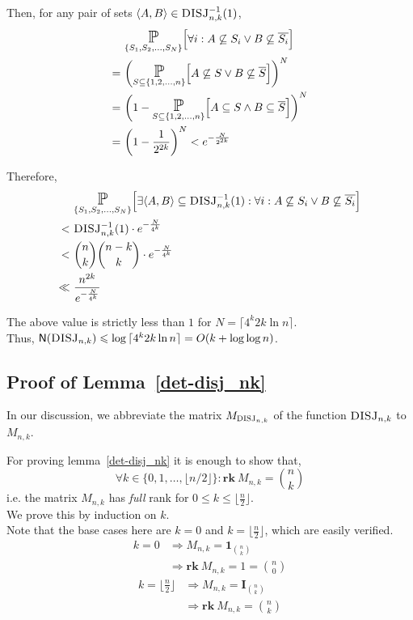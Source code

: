\documentclass[usletter]{article}
\newcommand*{\Scale}[2][4]{\scalebox{#1}{\ensuremath{#2}}}%
\newcommand {\mat}[1]  {\ensuremath{\mathbf{#1}}}
\newcommand {\complexity}[1] {\ensuremath{\mathsf{#1}}}
\newcommand {\N}             {\complexity{N}}
\newcommand {\function}[2]  {\ensuremath{\textsc{#1}_{#2}}}
\newcommand {\efunction}[3] {\ensuremath{\textsc{#1}^{#2}_{#3}}}
\newcommand {\DISJ}[2]      {\function{DISJ}{#1,#2}}
\newcommand {\iDISJ}[2]     {\efunction{DISJ}{-1}{#1,#2}}
\newcommand {\bigO}     {\ensuremath{O}}
\newcommand {\rank}     {\ensuremath{\mathbf{rk}}\ }
\newcommand {\operator}[1] {\ensuremath{\mathbb{#1}}}
\newcommand {\prob}        {\operator{P}}
\newcommand {\range}[2]  {\ensuremath{\{#1{1},#1{2},\ldots,#1{#2}\}}}
\newcommand {\zrange}[2] {\ensuremath{\{#1{0},#1{1},\ldots,#1{#2}\}}}
\begin{document}
\noindent
Then, for any pair of sets $\langle A, B\rangle \in \iDISJ{n}{k}(1)$,
\begin{align*}
&\underset{\range{S_}{N}}{\Scale[1.5]{\prob}}
   \Big[ \forall i : A \not\subseteq S_i \vee
                     B \not\subseteq \overline{S_i} \Big] \\
=\ &\bigg( \underset{S \subseteq \range{}{n}}{\Scale[1.5]{\prob}}
   \Big[ A \not\subseteq S \vee B \not\subseteq \overline{S} \Big] \bigg)^N \\
=\ &\bigg( 1 - \underset{S \subseteq \range{}{n}}{\Scale[1.5]{\prob}}
   \Big[ A \subseteq S \wedge B \subseteq \overline{S} \Big] \bigg)^N \\
=\ &\bigg( 1 - \frac{1}{2^{2k}} \bigg)^N  < e^{-\frac{N}{2^{2k}}}
\end{align*}

\noindent
Therefore,
\begin{align*}
&\underset{\range{S_}{N}}{\Scale[1.5]{\prob}}
   \Big[ \exists \langle A, B \rangle \subseteq \iDISJ{n}{k}(1) :
                 \forall i : A \not\subseteq S_i \vee
                             B \not\subseteq \overline{S_i} \Big] \\
<\ & \iDISJ{n}{k}(1) \cdot e^{-\frac{N}{4^k}} \\
<\ & \binom{n}{k} \binom{n-k}{k} \cdot e^{-\frac{N}{4^k}} \\
\ll\ & \frac{n^{2k}}{e^{-\frac{N}{4^k}}}
\end{align*}

\noindent
The above value is strictly less than $1$ for $N = \lceil 4^k 2k \ln{n}\rceil$. \\
Thus, $\N(\DISJ{n}{k}) \leqslant \log{\lceil 4^k 2k \ln{n}\rceil} = \bigO(k + \log{\log{n}})$.



\subsection{Proof of Lemma~\ref{det-disj_nk}}

In our discussion, we abbreviate the matrix $M_{\DISJ{n}{k}}$ of the function $\DISJ{n}{k}$ to $M_{n,k}$.

\noindent
For proving lemma~\ref{det-disj_nk} it is enough to show that,
$$
\forall k \in \zrange{}{\lfloor n/2 \rfloor} : \rank M_{n,k} = \binom{n}{k}
$$
i.e. the matrix $M_{n,k}$ has \textit{full} rank for $0 \leqslant k \leqslant \lfloor \frac{n}{2} \rfloor$. \\

\noindent
We prove this by induction on $k$. \\
Note that the base cases here are $k = 0$ and $k = \lfloor \frac{n}{2}\rfloor$, which are easily verified.
\begin{align*}
    k = 0 &\Rightarrow M_{n,k} = \mat{1}_{\binom{n}{k}} \\
          &\Rightarrow \rank M_{n,k} = 1 = \binom{n}{0}
\end{align*}
\begin{align*}
    k = \Big\lfloor \frac{n}{2} \Big\rfloor
        &\Rightarrow M_{n,k} = \mat{I}_{\binom{n}{k}} \\
        &\Rightarrow \rank M_{n,k} = \binom{n}{k}
\end{align*}
\end{document}
